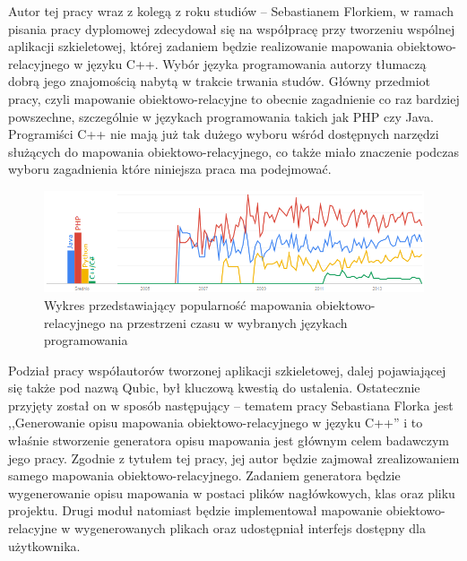 \documentclass[12pt]{report}
\begin{document}
Autor tej pracy wraz z kolegą z roku studiów -- Sebastianem Florkiem, w ramach pisania pracy dyplomowej zdecydował się na współpracę przy tworzeniu wspólnej aplikacji
szkieletowej, której zadaniem będzie realizowanie mapowania obiektowo-relacyjnego w języku C++. Wybór języka programowania autorzy tłumaczą dobrą jego 
znajomością nabytą w trakcie trwania studów. Główny przedmiot pracy, czyli mapowanie obiektowo-relacyjne to obecnie zagadnienie co raz bardziej powszechne, 
szczególnie w językach programowania takich jak PHP czy Java. Programiści C++ nie mają już tak dużego wyboru wśród dostępnych narzędzi służących do mapowania 
obiektowo-relacyjnego, co także miało znaczenie podczas wyboru zagadnienia które niniejsza praca ma podejmować.

\begin{figure}[H]
\centering
\includegraphics[width=\textwidth]{resources/trends.png}
\caption[Wykres przedstawiający popularność mapowania obiektowo-relacyjnego na przestrzeni czasu w wybranych językach programowania] {Wykres przedstawiający 
popularność mapowania obiektowo-relacyjnego na przestrzeni czasu w wybranych językach programowania \cite{trends}}
\end{figure}

Podział pracy współautorów tworzonej aplikacji szkieletowej, dalej pojawiającej się także pod nazwą Qubic, był kluczową kwestią do ustalenia. Ostatecznie przyjęty został
on w sposób następujący -- tematem pracy Sebastiana Florka jest ,,Generowanie opisu mapowania obiektowo-relacyjnego w języku C++'' i to właśnie stworzenie generatora opisu
mapowania jest głównym celem badawczym jego pracy. Zgodnie z tytułem tej pracy, jej autor będzie zajmował zrealizowaniem samego mapowania obiektowo-relacyjnego.
Zadaniem generatora będzie wygenerowanie opisu mapowania w postaci plików nagłówkowych, klas oraz pliku projektu. Drugi moduł natomiast będzie implementował 
mapowanie obiektowo-relacyjne w wygenerowanych plikach oraz udostępniał interfejs dostępny dla użytkownika.
\end{document}
